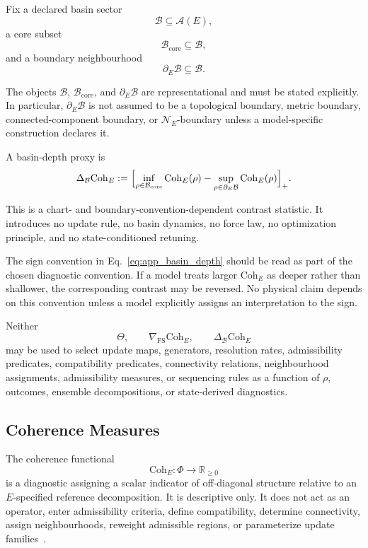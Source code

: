 \documentclass[aps,prx,onecolumn,11pt]{revtex4-2}
\theoremstyle{plain}
\theoremstyle{definition}
\theoremstyle{remark}
\begin{document}
Fix a declared basin sector
\[
\mathcal B\subseteq\mathcal A(E),
\]
a core subset
\[
\mathcal B_{\mathrm{core}}\subseteq\mathcal B,
\]
and a boundary neighbourhood
\[
\partial_E\mathcal B\subseteq\mathcal B.
\]

The objects \(\mathcal B\), \(\mathcal B_{\mathrm{core}}\), and
\(\partial_E\mathcal B\) are representational and must be stated
explicitly. In particular, \(\partial_E\mathcal B\) is not assumed to be
a topological boundary, metric boundary, connected-component boundary,
or \(\mathcal N_E\)-boundary unless a model-specific construction
declares it.

A basin-depth proxy is
\begin{equation}
\Delta_{\mathcal B}\mathrm{Coh}_E
:=
\Bigl[
\inf_{\rho\in\mathcal B_{\mathrm{core}}}
\mathrm{Coh}_E(\rho)
-
\sup_{\rho\in\partial_E\mathcal B}
\mathrm{Coh}_E(\rho)
\Bigr]_+.
\label{eq:app_basin_depth}
\end{equation}

This is a chart- and boundary-convention-dependent contrast statistic.
It introduces no update rule, no basin dynamics, no force law, no
optimization principle, and no state-conditioned retuning.

The sign convention in Eq.~\eqref{eq:app_basin_depth} should be read as
part of the chosen diagnostic convention. If a model treats larger
\(\mathrm{Coh}_E\) as deeper rather than shallower, the corresponding
contrast may be reversed. No physical claim depends on this convention
unless a model explicitly assigns an interpretation to the sign.

Neither
\[
\Theta,
\qquad
\nabla_{\mathrm{FS}}\mathrm{Coh}_E,
\qquad
\Delta_{\mathcal B}\mathrm{Coh}_E
\]
may be used to select update maps, generators, resolution rates,
admissibility predicates, compatibility predicates, connectivity
relations, neighbourhood assignments, admissibility measures, or
sequencing rules as a function of \(\rho\), outcomes, ensemble
decompositions, or state-derived diagnostics.

\subsection{Coherence Measures}
\label{app:coherence_measures}

The coherence functional
\[
\mathrm{Coh}_E:\Phi\to\mathbb{R}_{\geq 0}
\]
is a diagnostic assigning a scalar indicator of off-diagonal structure
relative to an \(E\)-specified reference decomposition. It is
descriptive only. It does not act as an operator, enter admissibility
criteria, define compatibility, determine connectivity, assign
neighbourhoods, reweight admissible regions, or parameterize update
families~\cite{Baumgratz2014,ChitambarGour2019}.
\end{document}
